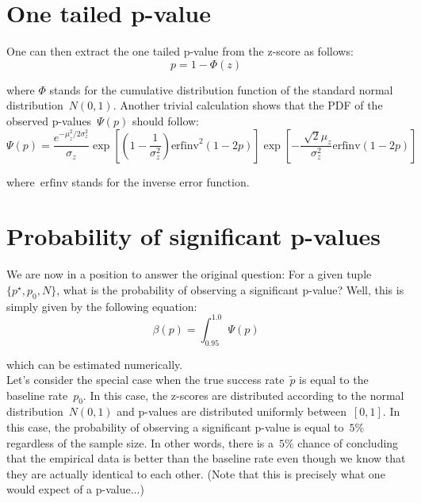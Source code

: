 \documentclass{article}
\begin{document}
\section{One tailed p-value}

One can then extract the one tailed p-value from the z-score as follows:
\begin{equation}
p = 1 - \Phi \left( z \right)
\end{equation}

\noindent where $\Phi$ stands for the cumulative distribution function of the standard normal distribution~$N(0, 1)$.  Another trivial calculation shows that the PDF of the observed p-values~$\Psi(p)$ should follow:
\begin{equation}
\Psi(p) = \frac{e^{- \mu_z^2 / 2\sigma_z^2}}{\sigma_z} \exp \left[ \left( 1 - \frac{1}{\sigma_z^2} \right)  \mbox{erfinv}^2 (1 - 2p)  \right] \exp \left[  - \frac{\sqrt[]{2} \mu_z}{\sigma_z^2} \mbox{erfinv} (1-2p) \right]
\end{equation}

\noindent where~$\mbox{erfinv}$ stands for the inverse error function.

\section{Probability of significant p-values}

We are now in a position to answer the original question:  For a given tuple~$\{ p^{\star}, p_0, N \}$, what is the probability of observing a significant p-value?  Well, this is simply given by the following equation:
\begin{equation}
\beta(p) = \int_{0.95}^{1.0} \Psi(p)
\end{equation}

\noindent which can be estimated numerically. \\

\noindent Let's consider the special case when the true success rate~$\tilde{p}$ is equal to the baseline rate~$p_0$.  In this case, the z-scores are distributed according to the normal distribution~$N(0, 1)$ and p-values are distributed uniformly between~$[0, 1]$.  In this case, the probability of observing a significant p-value is equal to~$5\%$ regardless of the sample size.  In other words, there is a~$5\%$ chance of concluding that the empirical data is better than the baseline rate even though we know that they are actually identical to each other.   (Note that this is precisely what one would expect of a p-value...) \\ 
\end{document}
